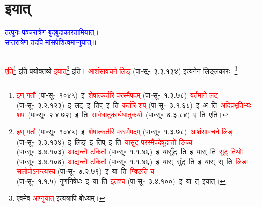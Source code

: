 \section[इयात्]{इयात्}
\centering\textcolor{blue}{तत्पुनः पञ्चरात्रेण बुद्बुदाकारतामियात्।\nopagebreak\\
सप्तरात्रेण तदपि मांसपेशित्वमाप्नुयात्॥}\nopagebreak\\
\\
\fontsize{14}{21}\selectfont\begin{sloppypar}\justifying\noindent\hspace{10mm} \textcolor{red}{एति}\footnote{\textcolor{red}{इण् गतौ} (पा॰सू॰~१०४५)~\arrow इ~\arrow \textcolor{red}{शेषात्कर्तरि परस्मैपदम्} (पा॰सू॰~१.३.७८)~\arrow \textcolor{red}{वर्तमाने लट्} (पा॰सू॰~३.२.१२३)~\arrow इ~लट्~\arrow इ~तिप्~\arrow इ~ति~\arrow \textcolor{red}{कर्तरि शप्‌} (पा॰सू॰~३.१.६८)~\arrow इ~अ~ति~\arrow \textcolor{red}{अदिप्रभृतिभ्यः शपः} (पा॰सू॰~२.४.७२)~\arrow इ~ति~\arrow \textcolor{red}{सार्वधातुकार्ध\-धातुकयोः} (पा॰सू॰~७.३.८४)~\arrow ए~ति~\arrow एति।} इति प्रयोक्तव्ये \textcolor{red}{इयात्}\footnote{\textcolor{red}{इण् गतौ} (पा॰सू॰~१०४५)~\arrow इ~\arrow \textcolor{red}{शेषात्कर्तरि परस्मैपदम्} (पा॰सू॰~१.३.७८)~\arrow \textcolor{red}{आशंसावचने लिङ्} (पा॰सू॰~३.३.१३४)~\arrow इ~लिङ्~\arrow इ~तिप्~\arrow इ~ति~\arrow \textcolor{red}{यासुट् परस्मैपदेषूदात्तो ङिच्च} (पा॰सू॰~३.४.१०३)~\arrow \textcolor{red}{आद्यन्तौ टकितौ} (पा॰सू॰~१.१.४६)~\arrow इ~यासुँट्~ति~\arrow इ~यास्~ति~\arrow \textcolor{red}{सुट् तिथोः} (पा॰सू॰~३.४.१०७)~\arrow \textcolor{red}{आद्यन्तौ टकितौ} (पा॰सू॰~१.१.४६)~\arrow इ~यास्~सुँट्~ति~\arrow इ~यास्~स्~ति~\arrow \textcolor{red}{लिङः सलोपोऽनन्त्यस्य} (पा॰सू॰~७.२.७९)~\arrow इ~या~ति~\arrow \textcolor{red}{ग्क्ङिति च} (पा॰सू॰~१.१.५)~\arrow गुणनिषेधः~\arrow इ~या~ति~\arrow \textcolor{red}{इतश्च} (पा॰सू॰~३.४.१००)~\arrow इ~या~त्~\arrow इयात्।} इति। \textcolor{red}{आशंसावचने लिङ्} (पा॰सू॰~३.३.१३४) इत्यनेन लिङ्लकारः।\footnote{एवमेव \textcolor{red}{आप्नुयात्} इत्यत्रापि बोध्यम्।}\end{sloppypar}
